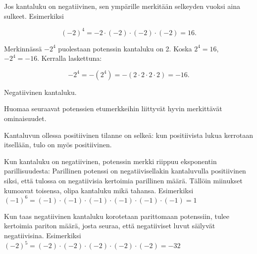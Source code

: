 Jos kantaluku on negatiivinen, sen ympärille merkitään selkeyden vuoksi
aina sulkeet. Esimerkiksi

\[ (-2)^4 = -2 \cdot (-2)\cdot(-2)\cdot(-2) = 16. \]

Merkinnässä $-2^4$ puolestaan potenssin kantaluku on 2. Koska $2^4 = 16$,
$-2^4=-16$. Kerralla laskettuna:     

\[ -2^4 =-(2^4)= -(2 \cdot 2\cdot 2 \cdot 2) = -16. \]          
            
    \begin{esimerkki}
        Negatiivinen kantaluku.
        \begin{alakohdat}
         \end{alakohdat}
    \end{esimerkki}
    
    
Huomaa seuraavat potenssien etumerkkeihin liittyvät hyvin merkittävät ominaisuudet.


Kantaluvun ollessa positiivinen tilanne on selkeä:  kun positiivista lukua kerrotaan itsellään, tulo on myös positiivinen. 

Kun kantaluku on negatiivinen, potenssin merkki riippuu eksponentin parillisuudesta: Parillinen potenssi on negatiivisellakin kantaluvulla positiivinen 
siksi, että tulossa on negatiivisia kertoimia parillinen määrä. Tällöin miinukset kumoavat toisensa, olipa kantaluku mikä tahansa. 
Esimerkiksi $(-1)^6=(-1) \cdot (-1) \cdot (-1) \cdot (-1) \cdot (-1) \cdot (-1)=1$

Kun taas negatiivinen kantaluku korotetaan parittomaan potenssiin, tulee kertoimia pariton määrä, josta seuraa, että negatiiviset luvut säilyvät negatiivisina. 
Esimerkiksi $(-2)^5=(-2) \cdot (-2) \cdot (-2) \cdot (-2) \cdot (-2)=-32$
    
